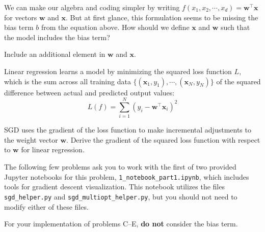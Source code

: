 \begin{problem}[2]
We can make our algebra and coding simpler by writing $f(x_1, x_2, \cdots, x_d) = \mathbf{w}^\intercal\mathbf{x}$ for vectors $\mathbf{w}$ and $\mathbf{x}$.
But at first glance, this formulation seems to be missing the bias term $b$ from the equation above.
How should we define $\mathbf{x}$ and $\mathbf{w}$ such that the model includes the bias term?
\end{problem}
\begin{hint}
	Include an additional element in $\mathbf{w}$ and $\mathbf{x}$.
\end{hint}
\begin{solution}

\end{solution}

Linear regression learns a model by minimizing the squared loss function $L$, which is the sum across all training data $\{(\mathbf{x}_1, y_1),\cdots,(\mathbf{x}_N, y_N)\}$ of the squared difference between actual and predicted output values:
\begin{equation}
	L(f) = \sum_{i=1}^N (y_i - \mathbf{w}^\intercal\mathbf{x}_i)^2
\end{equation}

\begin{problem}[2]
SGD uses the gradient of the loss function to make incremental adjustments to the weight vector $\mathbf{w}$.
Derive the gradient of the squared loss function with respect to $\mathbf{w}$ for linear regression.
\end{problem}
\begin{solution}

\end{solution}

The following few problems ask you to work with the first of two provided Jupyter notebooks for this problem, \texttt{1_notebook_part1.ipynb}, which includes tools for gradient descent visualization.
This notebook utilizes the files \texttt{sgd_helper.py} and \texttt{sgd_multiopt_helper.py}, but you should not need to modify either of these files.

\newpage

For your implementation of problems C--E, \textbf{do not} consider the bias term.


